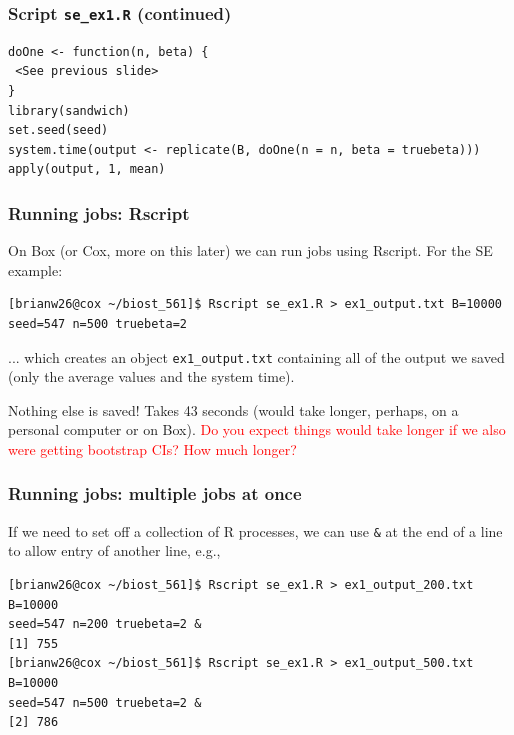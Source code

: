 \documentclass[12pt, 
hyperref={colorlinks=true, linkcolor=blue, urlcolor=cyan}]{beamer}
\begin{document}
\begin{frame}[fragile]
\frametitle{Script \texttt{se\_ex1.R} (continued)}
{\scriptsize
\begin{verbatim}
doOne <- function(n, beta) {
 <See previous slide>
}
library(sandwich)
set.seed(seed)
system.time(output <- replicate(B, doOne(n = n, beta = truebeta)))
apply(output, 1, mean)
\end{verbatim}
}
\end{frame}

\begin{frame}[fragile]
\frametitle{Running jobs: Rscript}
On Box (or Cox, more on this later) we can run jobs using Rscript. For the SE example:
{\scriptsize
\begin{verbatim}
[brianw26@cox ~/biost_561]$ Rscript se_ex1.R > ex1_output.txt B=10000 
seed=547 n=500 truebeta=2
\end{verbatim}}
 ... which creates an object \texttt{ex1\_output.txt} containing all of the output we saved (only the average values and the system time).

Nothing else is saved! Takes 43 seconds (would take longer, perhaps, on a personal computer or on Box). \textcolor{red}{Do you expect things would take longer if we also were getting bootstrap CIs? How much longer?}
\end{frame}

\begin{frame}[fragile]
\frametitle{Running jobs: multiple jobs at once}
If we need to set off a collection of R processes, we can use \texttt{\&} at the end of a line to allow entry of another line, e.g., 
{\scriptsize
\begin{verbatim}
[brianw26@cox ~/biost_561]$ Rscript se_ex1.R > ex1_output_200.txt B=10000 
seed=547 n=200 truebeta=2 &
[1] 755
[brianw26@cox ~/biost_561]$ Rscript se_ex1.R > ex1_output_500.txt B=10000 
seed=547 n=500 truebeta=2 &
[2] 786
\end{verbatim}
}
\end{frame}
\end{document}
